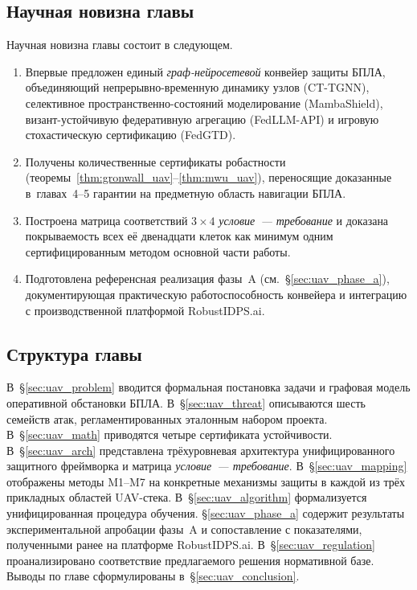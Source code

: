 \subsection*{Научная новизна главы}
Научная новизна главы состоит в следующем.
\begin{enumerate}\setlength\itemsep{0.1em}
\item Впервые предложен единый \emph{граф-нейросетевой} конвейер защиты
БПЛА, объединяющий непрерывно-временную динамику узлов
(\textsf{CT-TGNN}), селективное пространственно-состояний моделирование
(\textsf{MambaShield}), визант-устойчивую федеративную агрегацию
(\textsf{FedLLM-API}) и игровую стохастическую сертификацию
(\textsf{FedGTD}).
\item Получены количественные сертификаты робастности
(теоремы~\ref{thm:gronwall_uav}--\ref{thm:mwu_uav}), переносящие
доказанные в~главах~4--5 гарантии на предметную область навигации БПЛА.
\item Построена матрица соответствий $3\times4$
\emph{условие~--- требование} и доказана покрываемость всех её
двенадцати клеток как минимум одним сертифицированным методом
основной части работы.
\item Подготовлена референсная реализация фазы~A
(см.~\S\ref{sec:uav_phase_a}), документирующая практическую
работоспособность конвейера и интеграцию с производственной платформой
\textsf{RobustIDPS.ai}.
\end{enumerate}

\subsection*{Структура главы}
В~\S\ref{sec:uav_problem} вводится формальная постановка задачи и
графовая модель оперативной обстановки БПЛА. В~\S\ref{sec:uav_threat}
описываются шесть семейств атак, регламентированных эталонным набором
проекта. В~\S\ref{sec:uav_math} приводятся четыре сертификата
устойчивости. В~\S\ref{sec:uav_arch} представлена трёхуровневая
архитектура унифицированного защитного фреймворка и матрица
\emph{условие~--- требование}. В~\S\ref{sec:uav_mapping} отображены
методы \textsf{M1}--\textsf{M7} на конкретные механизмы защиты в каждой
из трёх прикладных областей UAV-стека. В~\S\ref{sec:uav_algorithm}
формализуется унифицированная процедура обучения.
\S\ref{sec:uav_phase_a} содержит результаты экспериментальной апробации
фазы~A и сопоставление с показателями, полученными ранее на платформе
\textsf{RobustIDPS.ai}. В~\S\ref{sec:uav_regulation} проанализировано
соответствие предлагаемого решения нормативной базе. Выводы по главе
сформулированы в~\S\ref{sec:uav_conclusion}.

